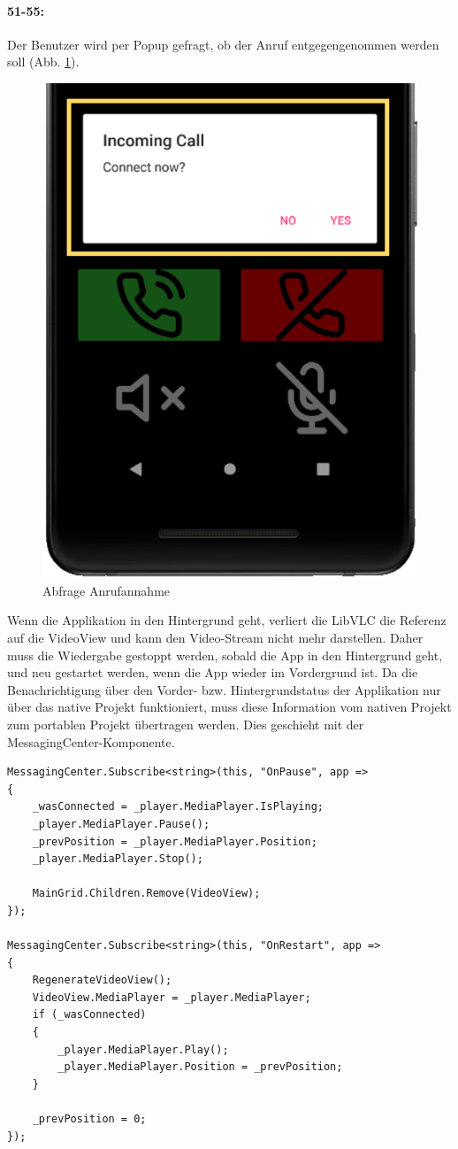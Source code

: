 \paragraph{51-55:} Der Benutzer wird per Popup gefragt, ob der Anruf entgegengenommen werden soll (Abb. \ref{fig:inc-call}).
\begin{figure}
    \centering
    \includegraphics[width=.5\linewidth]{images/xamarin/IncomingCall.png}
    \caption{Abfrage Anrufannahme}
    \label{fig:inc-call}
\end{figure}
Wenn die Applikation in den Hintergrund geht, verliert die LibVLC die Referenz auf die VideoView und kann den Video-Stream nicht mehr darstellen.
Daher muss die Wiedergabe gestoppt werden, sobald die App in den Hintergrund geht, und neu gestartet werden, wenn die App wieder im Vordergrund ist.
Da die Benachrichtigung über den Vorder- bzw. Hintergrundstatus der Applikation nur über das native Projekt funktioniert, muss diese Information vom nativen Projekt zum portablen Projekt übertragen werden.
Dies geschieht mit der MessagingCenter-Komponente.
\begin{verbatim}
MessagingCenter.Subscribe<string>(this, "OnPause", app =>
{
    _wasConnected = _player.MediaPlayer.IsPlaying;
    _player.MediaPlayer.Pause();
    _prevPosition = _player.MediaPlayer.Position;
    _player.MediaPlayer.Stop();

    MainGrid.Children.Remove(VideoView);
});

MessagingCenter.Subscribe<string>(this, "OnRestart", app =>
{
    RegenerateVideoView();
    VideoView.MediaPlayer = _player.MediaPlayer;
    if (_wasConnected)
    {
        _player.MediaPlayer.Play();
        _player.MediaPlayer.Position = _prevPosition;
    }

    _prevPosition = 0;
});
\end{verbatim}
